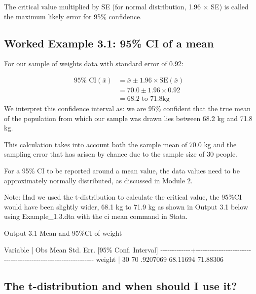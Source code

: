 \documentclass[
]{memoir}
\newenvironment{Shaded}{\begin{snugshade}}{\end{snugshade}}
\newcommand{\NormalTok}[1]{#1}
\begin{document}
The critical value multiplied by SE (for normal distribution, 1.96 × SE) is called the maximum likely error for 95\% confidence.

\hypertarget{worked-example-3.1-95-ci-of-a-mean}{%
\subsection{Worked Example 3.1: 95\% CI of a mean}\label{worked-example-3.1-95-ci-of-a-mean}}

For our sample of weights data with standard error of 0.92:

\[
\begin{aligned}
\ 95\% \text{ CI}(\bar{x}) &=  \bar{x} \pm 1.96 \times \text{SE}(\bar{x}) \\
 &= 70.0 \pm 1.96 \times 0.92 \\
 &= 68.2 \text{ to } 71.8 \text{kg}
\end{aligned}
\]
We interpret this confidence interval as: we are 95\% confident that the true mean of the population from which our sample was drawn lies between 68.2 kg and 71.8 kg.

This calculation takes into account both the sample mean of 70.0 kg and the sampling error that has arisen by chance due to the sample size of 30 people.

For a 95\% CI to be reported around a mean value, the data values need to be approximately normally distributed, as discussed in Module 2.

Note: Had we used the t-distribution to calculate the critical value, the 95\%CI would have been slightly wider, 68.1 kg to 71.9 kg as shown in Output 3.1 below using Example\_1.3.dta with the ci mean command in Stata.

Output 3.1 Mean and 95\%CI of weight

\begin{Shaded}
\begin{Highlighting}[]
\NormalTok{    Variable |        Obs        Mean    Std. Err.       [95\% Conf. Interval]}
\NormalTok{{-}{-}{-}{-}{-}{-}{-}{-}{-}{-}{-}{-}{-}+{-}{-}{-}{-}{-}{-}{-}{-}{-}{-}{-}{-}{-}{-}{-}{-}{-}{-}{-}{-}{-}{-}{-}{-}{-}{-}{-}{-}{-}{-}{-}{-}{-}{-}{-}{-}{-}{-}{-}{-}{-}{-}{-}{-}{-}{-}{-}{-}{-}{-}{-}{-}{-}{-}{-}{-}{-}{-}{-}{-}{-}{-}{-}}
\NormalTok{      weight |         30          70    .9207069        68.11694    71.88306}
\end{Highlighting}
\end{Shaded}

\hypertarget{the-t-distribution-and-when-should-i-use-it}{%
\subsection{The t-distribution and when should I use it?}\label{the-t-distribution-and-when-should-i-use-it}}
\end{document}
